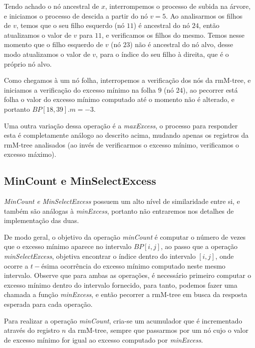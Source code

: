 \begin{example}
        Tendo achado o nó ancestral de $x$, interrompemos o processo de subida na árvore, e iniciamos o processo de descida  a partir do nó $v=5$. Ao analisarmos os filhos de $v$, temos que o seu filho esquerdo (nó $11$) é ancestral do nó $24$, então atualizamos o valor de $v$ para $11$, e verificamos os filhos do mesmo. Temos nesse momento que o filho esquerdo de $v$ (nó $23$) não é ancestral do nó alvo, desse modo atualizamos o valor de $v$, para o índice do seu filho à direita, que é o próprio nó alvo.

        Como chegamos à um nó folha, interropemos a verificação dos nós da rmM-tree, e iniciamos a verificação do excesso mínimo na folha $9$ (nó $24$), ao pecorrer está folha o valor do excesso mínimo computado até o momento não é alterado, e portanto $BP[18,39].m=-3$.
    \end{example}

        
        Uma outra variação dessa operação é a \textit{maxExcess}, o processo para responder esta é completamente análogo ao descrito acima, mudando apenas os registros da rmM-tree analisados (ao invés de verificarmos o excesso mínimo, verificamos o excesso máximo).

    \subsection{MinCount e MinSelectExcess}
    \textit{MinCount e MinSelectExcess} possuem um alto nível de similaridade entre si, e também são análogas à \textit{minExcess}, portanto não entraremos nos detalhes de implementação das duas.
    
    De modo geral, o objetivo da operação \textit{minCount} é computar o número de vezes que o excesso mínimo aparece no intervalo $BP[i,j]$, ao passo que a operação \textit{minSelectExcess}, 
    objetiva encontrar o índice dentro do intervalo $[i,j]$, onde ocorre a $t-$ésima ocorrência do excesso mínimo computado neste mesmo intervalo. 
    Observe que para ambas as operações, é necessário primeiro computar o excesso mínimo dentro do intervalo fornecido, para tanto, podemos fazer uma chamada a função \textit{minExcess}, 
    e então pecorrer a rmM-tree em busca da resposta esperada para cada operação. 
    
    Para realizar a operação \textit{minCount}, cria-se um acumulador que é incrementado através do registro $n$ da rmM-tree, sempre que passarmos por um nó cujo o valor de excesso mínimo for igual ao excesso computado por \textit{minExcess}. 

